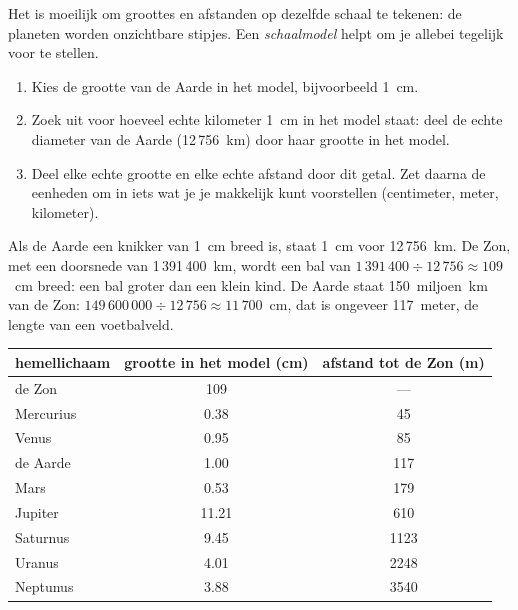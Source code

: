Het is moeilijk om groottes en afstanden op dezelfde schaal te tekenen: de
planeten worden onzichtbare stipjes. Een \emph{schaalmodel} helpt om je
allebei tegelijk voor te stellen.

\begin{method}\label{met:g6:earth-a-planet:scale-model}
\begin{enumerate}
  \item Kies de grootte van de Aarde in het model, bijvoorbeeld 1~cm.
  \item Zoek uit voor hoeveel echte kilometer 1~cm in het model staat: deel
        de echte diameter van de Aarde (12\,756~km) door haar grootte in het
        model.
  \item Deel elke echte grootte en elke echte afstand door dit getal.
        Zet daarna de eenheden om in iets wat je je makkelijk kunt
        voorstellen (centimeter, meter, kilometer).
\end{enumerate}
\end{method}

\begin{example}\label{ex:g6:earth-a-planet:marble}
Als de Aarde een knikker van 1~cm breed is, staat 1~cm voor 12\,756~km. De
Zon, met een doorsnede van 1\,391\,400~km, wordt een bal van $1\,391\,400 \div 12\,756 \approx
109$~cm breed: een bal groter dan een klein kind. De Aarde staat 150~miljoen~km van de Zon:
$149\,600\,000 \div 12\,756 \approx 11\,700$~cm, dat is ongeveer 117~meter,
de lengte van een voetbalveld.
\end{example}

\begin{center}\small
\begin{tabular}{|l|c|c|}
\hline
\textbf{hemellichaam} & \textbf{grootte in het model (cm)} & \textbf{afstand tot de Zon (m)} \\
\hline
de Zon & 109 & --- \\
Mercurius & 0.38 & 45 \\
Venus & 0.95 & 85 \\
de Aarde & 1.00 & 117 \\
Mars & 0.53 & 179 \\
Jupiter & 11.21 & 610 \\
Saturnus & 9.45 & 1123 \\
Uranus & 4.01 & 2248 \\
Neptunus & 3.88 & 3540 \\
\hline
\end{tabular}
\end{center}

